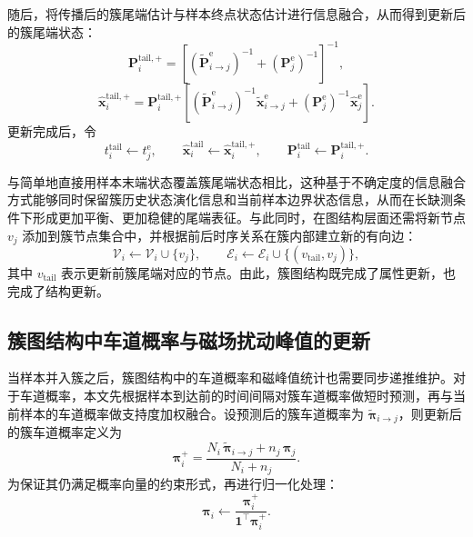 \documentclass{xdupgthesis}
\begin{document}
随后，将传播后的簇尾端估计与样本终点状态估计进行信息融合，从而得到更新后的簇尾端状态：
\begin{equation}
	\mathbf{P}_i^{\mathrm{tail},+}
	=
	\left[
	\left(\tilde{\mathbf{P}}_{i\rightarrow j}^{\mathrm{e}}\right)^{-1}
	+
	\left(\mathbf{P}_j^{\mathrm{e}}\right)^{-1}
	\right]^{-1},
\end{equation}
\begin{equation}
	\hat{\mathbf{x}}_i^{\mathrm{tail},+}
	=
	\mathbf{P}_i^{\mathrm{tail},+}
	\left[
	\left(\tilde{\mathbf{P}}_{i\rightarrow j}^{\mathrm{e}}\right)^{-1}
	\tilde{\mathbf{x}}_{i\rightarrow j}^{\mathrm{e}}
	+
	\left(\mathbf{P}_j^{\mathrm{e}}\right)^{-1}
	\hat{\mathbf{x}}_j^{\mathrm{e}}
	\right].
\end{equation}
更新完成后，令
\begin{equation}
	t_i^{\mathrm{tail}} \leftarrow t_j^{\mathrm{e}}, \qquad
	\hat{\mathbf{x}}_i^{\mathrm{tail}} \leftarrow \hat{\mathbf{x}}_i^{\mathrm{tail},+}, \qquad
	\mathbf{P}_i^{\mathrm{tail}} \leftarrow \mathbf{P}_i^{\mathrm{tail},+}.
\end{equation}

与简单地直接用样本末端状态覆盖簇尾端状态相比，这种基于不确定度的信息融合方式能够同时保留簇历史状态演化信息和当前样本边界状态信息，从而在长缺测条件下形成更加平衡、更加稳健的尾端表征。与此同时，在图结构层面还需将新节点 $v_j$ 添加到簇节点集合中，并根据前后时序关系在簇内部建立新的有向边：
\begin{equation}
	\mathcal{V}_i \leftarrow \mathcal{V}_i \cup \{v_j\}, \qquad
	\mathcal{E}_i \leftarrow \mathcal{E}_i \cup \{(v_{\mathrm{tail}},v_j)\},
\end{equation}
其中 $v_{\mathrm{tail}}$ 表示更新前簇尾端对应的节点。由此，簇图结构既完成了属性更新，也完成了结构更新。

\subsection{簇图结构中车道概率与磁场扰动峰值的更新}

当样本并入簇之后，簇图结构中的车道概率和磁峰值统计也需要同步递推维护。对于车道概率，本文先根据样本到达前的时间间隔对簇车道概率做短时预测，再与当前样本的车道概率做支持度加权融合。设预测后的簇车道概率为 $\tilde{\boldsymbol{\pi}}_{i\rightarrow j}$，则更新后的簇车道概率定义为
\begin{equation}
	\boldsymbol{\pi}_i^{+}
	=
	\frac{N_i\,\tilde{\boldsymbol{\pi}}_{i\rightarrow j}+n_j\,\boldsymbol{\pi}_j}
	{N_i+n_j}.
\end{equation}
为保证其仍满足概率向量的约束形式，再进行归一化处理：
\begin{equation}
	\boldsymbol{\pi}_i
	\leftarrow
	\frac{\boldsymbol{\pi}_i^{+}}{\mathbf{1}^{\top}\boldsymbol{\pi}_i^{+}}.
\end{equation}
\end{document}

